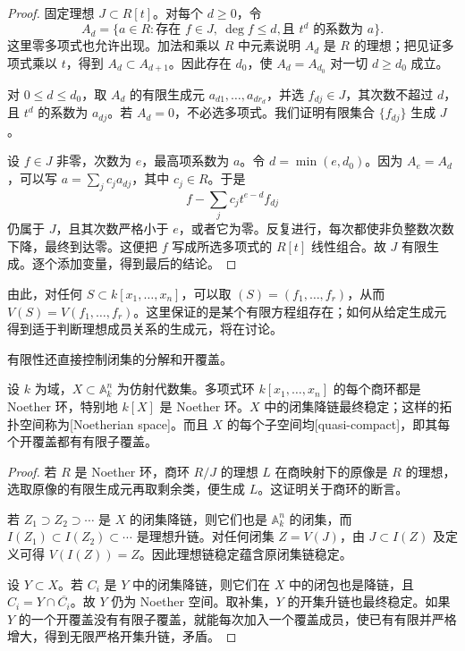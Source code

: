 \begin{proof}
	固定理想 \(J\subset R[t]\)。对每个 \(d\geq0\)，令
	\[
		A_d=\{a\in R:\text{存在 }f\in J,\ \deg f\leq d,
		\text{且 }t^d\text{ 的系数为 }a\}.
	\]
	这里零多项式也允许出现。加法和乘以 \(R\) 中元素说明 \(A_d\) 是 \(R\) 的理想；把见证多项式乘以 \(t\)，得到 \(A_d\subset A_{d+1}\)。因此存在 \(d_0\)，使 \(A_d=A_{d_0}\) 对一切 \(d\geq d_0\) 成立。

	对 \(0\leq d\leq d_0\)，取 \(A_d\) 的有限生成元 \(a_{d1},\ldots,a_{dr_d}\)，并选 \(f_{dj}\in J\)，其次数不超过 \(d\)，且 \(t^d\) 的系数为 \(a_{dj}\)。若 \(A_d=0\)，不必选多项式。我们证明有限集合 \(\{f_{dj}\}\) 生成 \(J\)。

	设 \(f\in J\) 非零，次数为 \(e\)，最高项系数为 \(a\)。令 \(d=\min(e,d_0)\)。因为 \(A_e=A_d\)，可以写 \(a=\sum_jc_ja_{dj}\)，其中 \(c_j\in R\)。于是
	\[
		f-\sum_jc_jt^{e-d}f_{dj}
	\]
	仍属于 \(J\)，且其次数严格小于 \(e\)，或者它为零。反复进行，每次都使非负整数次数下降，最终到达零。这便把 \(f\) 写成所选多项式的 \(R[t]\) 线性组合。故 \(J\) 有限生成。逐个添加变量，得到最后的结论。
\end{proof}

由此，对任何 \(S\subset k[x_1,\ldots,x_n]\)，可以取 \((S)=(f_1,\ldots,f_r)\)，从而 \(V(S)=V(f_1,\ldots,f_r)\)。这里保证的是某个有限方程组存在；如何从给定生成元得到适于判断理想成员关系的生成元，将在讨论。

有限性还直接控制闭集的分解和开覆盖。

\begin{proposition}\label{g5:prop:affine-noetherian}
	设 \(k\) 为域，\(X\subset\mathbb A_k^n\) 为仿射代数集。多项式环 \(k[x_1,\ldots,x_n]\) 的每个商环都是 Noether 环，特别地 \(k[X]\) 是 Noether 环。\(X\) 中的闭集降链最终稳定；这样的拓扑空间称为[Noetherian space]。而且 \(X\) 的每个子空间均[quasi-compact]，即其每个开覆盖都有有限子覆盖。
\end{proposition}
\begin{proof}
	若 \(R\) 是 Noether 环，商环 \(R/J\) 的理想 \(L\) 在商映射下的原像是 \(R\) 的理想，选取原像的有限生成元再取剩余类，便生成 \(L\)。这证明关于商环的断言。

	若 \(Z_1\supset Z_2\supset\cdots\) 是 \(X\) 的闭集降链，则它们也是 \(\mathbb A_k^n\) 的闭集，而 \(I(Z_1)\subset I(Z_2)\subset\cdots\) 是理想升链。对任何闭集 \(Z=V(J)\)，由 \(J\subset I(Z)\) 及定义可得 \(V(I(Z))=Z\)。因此理想链稳定蕴含原闭集链稳定。

	设 \(Y\subset X\)。若 \(C_i\) 是 \(Y\) 中的闭集降链，则它们在 \(X\) 中的闭包也是降链，且 \(C_i=Y\cap\overline{C_i}\)。故 \(Y\) 仍为 Noether 空间。取补集，\(Y\) 的开集升链也最终稳定。如果 \(Y\) 的一个开覆盖没有有限子覆盖，就能每次加入一个覆盖成员，使已有有限并严格增大，得到无限严格开集升链，矛盾。
\end{proof}

